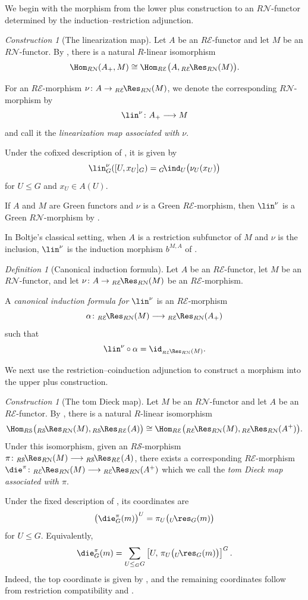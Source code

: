 \documentclass{amsart}
\numberwithin{equation}{section}%
\theoremstyle{remark}
\newtheorem{Def}[equation]{Definition}
\newtheorem{Cons}[equation]{Construction}
\theoremstyle{definition}
\newcommand{\e}{\mathcal E}
\newcommand{\s}{\mathcal S}
\newcommand{\n}{\mathcal N}
\newcommand{\lind}[1]{{}_{#1}\!\ind}
\newcommand{\lres}[1]{{}_{#1}\!\res}
\newcommand{\lRes}[1]{{}_{#1}\!\Res}
\newcommand{\iRes}[2]{{}_{#1}\!\Res_{#2}}
\begin{document}
We begin with the morphism from the lower plus construction to an
$R\n$-functor determined by the induction--restriction adjunction.
%
\begin{Cons}[The linearization map]
\label{con:linearization-map}
Let $A$ be an $R\e$-functor and let $M$ be an
$R\n$-functor.
By , there is a
natural $R$-linear isomorphism
\[
\Hom_{R\n}(A_+,M)
\cong
\Hom_{R\e}
\bigl(
A,\iRes{R\e}{R\n}(M)
\bigr).
\]

For an $R\e$-morphism
$\nu\colon A\to\iRes{R\e}{R\n}(M)$,
we denote the corresponding $R\n$-morphism by
\[
\lin^\nu\colon A_+\longrightarrow M
\]
and call it the \emph{linearization map associated with $\nu$}.

Under the cofixed description of
, it is given by
\[
\lin_G^\nu([U,x_U]_G)
=
\lind{G}_U\bigl(\nu_U(x_U)\bigr)
\]
for $U\leq G$ and $x_U\in A(U)$.

If $A$ and $M$ are Green functors and $\nu$ is a
Green $R\e$-morphism, then $\lin^\nu$ is a
Green $R\n$-morphism by
.

In Boltje's classical setting, when $A$ is a restriction
subfunctor of $M$ and $\nu$ is the inclusion, $\lin^\nu$
is the induction morphism $b^{M,A}$ of
\cite[Sec.~3.1]{Boltje98a}.
\end{Cons}
%
\begin{Def}[Canonical induction formula]
\label{def:canonical-induction-formula}
Let $A$ be an $R\e$-functor, let $M$ be an
$R\n$-functor, and let
$\nu\colon A\to\iRes{R\e}{R\n}(M)$
be an $R\e$-morphism.

A \emph{canonical induction formula for $\lin^\nu$}
is an $R\e$-morphism
\[
\alpha\colon
\iRes{R\e}{R\n}(M)
\longrightarrow
\iRes{R\e}{R\n}(A_+)
\]
such that
\[
\lin^\nu\circ\alpha
=
\id_{\iRes{R\e}{R\n}(M)}.
\]
\end{Def}
%
We next use the restriction--coinduction adjunction to construct a
morphism into the upper plus construction.
%
\begin{Cons}[The tom Dieck map]
\label{con:tom-Dieck-map}
Let $M$ be an $R\n$-functor and let $A$ be an
$R\e$-functor. By , there is a 
natural $R$-linear isomorphism
%
\[
\Hom_{R\s}
\bigl(
{}\lRes{R\s}_{R\n}(M),
{}\lRes{R\s}_{R\e}(A)
\bigr)
\cong
\Hom_{R\e}
\bigl(
{}\lRes{R\e}_{R\n}(M),
{}\lRes{R\e}_{R\n}(A^+)
\bigr).
\]
%
Under this isomorphism, given an $R\s$-morphism
$\pi\colon
{}\lRes{R\s}_{R\n}(M)
\longrightarrow
{}\lRes{R\s}_{R\e}(A)$,
there exists a corresponding $R\e$-morphism
$\die^\pi\colon
{}\lRes{R\e}_{R\n}(M)
\longrightarrow
{}\lRes{R\e}_{R\n}(A^+)$
which we call the \emph{tom Dieck map associated with $\pi$}.

Under the fixed description of
, its coordinates are
\[
\bigl(\die_G^\pi(m)\bigr)^U
=
\pi_U\bigl({}\lres{U}_G(m)\bigr)
\]
for $U\leq G$. Equivalently,
\[
\die_G^\pi(m)
=
\sum_{U\leq_GG}
\left[
U,\,
\pi_U\bigl({}\lres{U}_G(m)\bigr)
\right]^G.
\]
%
Indeed, the top coordinate is given by
, and the remaining coordinates
follow from restriction compatibility and
.
\end{Cons}
\end{document}
